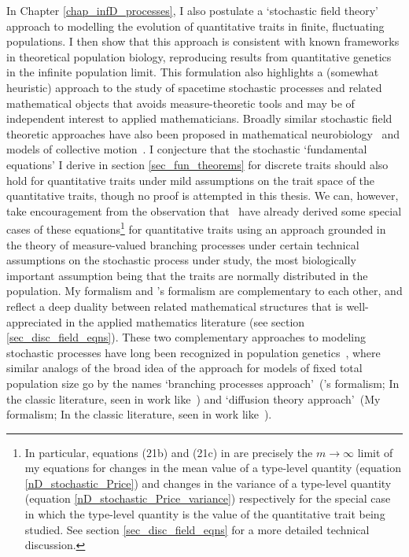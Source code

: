 In Chapter \ref{chap_infD_processes}, I also postulate a `stochastic field theory' approach to modelling the evolution of quantitative traits in finite, fluctuating populations. I then show that this approach is consistent with known frameworks in theoretical population biology, reproducing results from quantitative genetics in the infinite population limit. This formulation also highlights a (somewhat heuristic) approach to the study of spacetime stochastic processes and related mathematical objects that avoids measure-theoretic tools and may be of independent interest to applied mathematicians. Broadly similar stochastic field theoretic approaches have also been proposed in mathematical neurobiology~\citep{buice_field-theoretic_2007,bressloff_stochastic_2010,coombes_neural_2014} and models of collective motion~\citep{o_laighleis_minimal_2018}. I conjecture that the stochastic `fundamental equations' I derive in section \ref{sec_fun_theorems} for discrete traits should also hold for quantitative traits under mild assumptions on the trait space of the quantitative traits, though no proof is attempted in this thesis. We can, however, take encouragement from the observation that~\cite{week_white_2021} have already derived some special cases of these equations\footnote{In particular, equations (21b) and (21c) in \cite{week_white_2021} are precisely the $m \to \infty$ limit of my equations for changes in the mean value of a type-level quantity (equation \ref{nD_stochastic_Price}) and changes in the variance of a type-level quantity (equation \ref{nD_stochastic_Price_variance}) respectively for the special case in which the type-level quantity is the value of the quantitative trait being studied. See section \ref{sec_disc_field_eqns} for a more detailed technical discussion.} for quantitative traits using an approach grounded in the theory of measure-valued branching processes under certain technical assumptions on the stochastic process under study, the most biologically important assumption being that the traits are normally distributed in the population. My formalism and \cite{week_white_2021}'s formalism are complementary to each other, and reflect a deep duality between related mathematical structures that is well-appreciated in the applied mathematics literature (see section \ref{sec_disc_field_eqns}). These two complementary approaches to modeling stochastic processes have long been recognized in population genetics~\citep{lambert_probability_2006}, where similar analogs of the broad idea of the approach for models of fixed total population size go by the names `branching processes approach'~(\cite{week_white_2021}'s formalism; In the classic literature, seen in work like~\cite{haldane_mathematical_1927,fisher_distribution_1931}) and `diffusion theory approach'~(My formalism; In the classic literature, seen in work like~\cite{wright_evolution_1931,kimura_problems_1957}).

